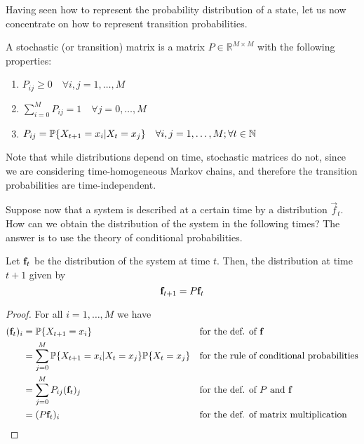 \smallskip
Having seen how to represent the probability distribution of a state, let us now concentrate on how to represent transition probabilities.

\begin{ndef} 
    A stochastic (or transition) matrix is a matrix $P \in \mathbb{R}^{M\times M}$ with the following properties:
    \begin{center}
        \begin{enumerate}
            \item $P_{ij} \geq 0 \quad \forall i,j = 1,\dots,M$
            \item $\sum_{i = 0}^M P_{ij} = 1 \quad \forall j = 0,\dots,M$ 
            \item $P_{ij} = \mathbb{P}\{X_{t+1} = x_i | X_t = x_j \} \quad \forall i,j = 1,\dots,M; \forall t\in \mathbb N$
        \end{enumerate}
    \end{center}
\end{ndef}

Note that while distributions depend on time, stochastic matrices do not, since we are considering time-homogeneous Markov chains, and therefore the transition probabilities are time-independent.

\smallskip
Suppose now that a system is described at a certain time by a distribution $\vec{f}_t$. How can we obtain the distribution of the system in the following times? The answer is to use the theory of conditional probabilities.

\begin{theorem} \label{th:evolution_simple}
    Let $\mathbf{f}_t$ be the distribution of the system at time $t$. Then, the distribution at time $t + 1$ given by
    \begin{equation}
        \mathbf{f}_{t+1} = P \mathbf{f}_t
    \end{equation}
\end{theorem}
\begin{proof}
    For all $i = 1,\dots,M$ we have
    \begin{align}
        (\mathbf{f}_t)_i 
            & = \mathbb{P}\{X_{t+1} = x_i \} && \text{for the def. of $\mathbf{f}$}\\
            & = \sum_{j = 0}^M \mathbb{P}\{X_{t+1} = x_i | X_t = x_j\} \mathbb{P}\{X_t = x_j\} && \text{for the rule of conditional probabilities}\\
            & = \sum_{j = 0}^M P_{ij} (\mathbf{f}_t)_j && \text{for the def. of $P$ and $\mathbf{f}$} \label{eq:matmul1}\\
            & = (P \mathbf{f}_t)_i && \text{for the def. of matrix multiplication} \label{eq:matmul2}
    \end{align}

\end{proof}

